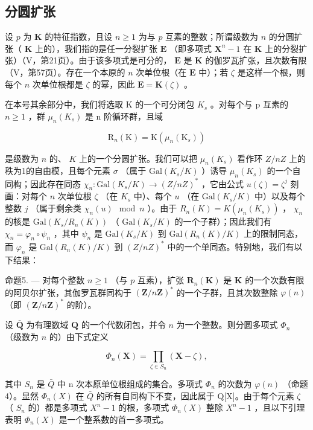 \subsection{分圆扩张}

设 \(p\) 为 \(\mathbf{K}\) 的特征指数，且设 \(n \geqslant 1\) 为与 \(p\) 互素的整数；所谓级数为 \(n\) 的分圆扩张（ \(\mathbf{K}\) 上的），我们指的是任一分裂扩张 \(\mathbf{E}\) （即多项式 \(\mathbf{X}^n - 1\) 在 \(\mathbf{K}\) 上的分裂扩张）（V，第21页）。由于该多项式是可分的， \(\mathbf{E}\) 是 \(\mathbf{K}\) 的伽罗瓦扩张，且次数有限（V，第57页）。存在一个本原的 \(n\) 次单位根（在 \(\mathbf{E}\) 中）；若 \(\zeta\) 是这样一个根，则每个 \(n\) 次单位根都是 \(\zeta\) 的幂，因此 \(\mathbf{E} = \mathbf{K}(\zeta)\) 。

在本号其余部分中，我们将选取 K 的一个可分闭包 \(K_{s}\) 。对每个与 p 互素的 \(n \geqslant 1\) ，群 \(\mu_{n}(K_{s})\) 是 n 阶循环群，且域

\[
\mathrm{R} _ {n} (\mathrm{K}) = \mathrm{K} \left(\mu_ {n} \left(\mathrm{K} _ {s}\right)\right)
\]

是级数为 \(n\) 的、 \(K\) 上的一个分圆扩张。我们可以把 \(\mu_n(K_s)\) 看作环 \(Z/nZ\) 上的秩为1的自由模，且每个元素 \(\sigma\) （属于 \(\text{Gal}(K_s/K)\) ）诱导 \(\mu_n(K_s)\) 的一个自同构；因此存在同态 \(\chi_n: \text{Gal}(K_s/K) \to (Z/nZ)^*\) ，它由公式 \(u(\zeta) = \zeta^j\) 刻画：对每个 \(n\) 次单位根 \(\zeta\) （在 \(K_s\) 中）、每个 \(u\) （在 \(\text{Gal}(K_s/K)\) 中）以及每个整数 \(j\) （属于剩余类 \(\chi_n(u) \mod n\) ）。由于 \(R_n(K) = K(\mu_n(K_s))\) ， \(\chi_n\) 的核是 \(\text{Gal}(K_s/R_n(K))\) （ \(\text{Gal}(K_s/K)\) 的一个子群）；因此我们有 \(\chi_n = \varphi_n \circ \psi_n\) ，其中 \(\psi_n\) 是 \(\text{Gal}(K_s/K)\) 到 \(\text{Gal}(R_n(K)/K)\) 上的限制同态，而 \(\varphi_n\) 是 \(\text{Gal}(R_n(K)/K)\) 到 \((Z/nZ)^*\) 中的一个单同态。特别地，我们有以下结果：

命题5. --- 对每个整数 \(n \geqslant 1\) （与 \(p\) 互素），扩张 \(\mathbf{R}_n(\mathbf{K})\) 是 \(\mathbf{K}\) 的一个次数有限的阿贝尔扩张，其伽罗瓦群同构于 \((\mathbf{Z}/n\mathbf{Z})^*\) 的一个子群，且其次数整除 \(\varphi(n)\) （即 \((\mathbf{Z}/n\mathbf{Z})^*\) 的阶）。

设 \(\bar{\mathbf{Q}}\) 为有理数域 \(\mathbf{Q}\) 的一个代数闭包，并令 \(n\) 为一个整数。则分圆多项式 \(\Phi_n\) （级数为 \(n\) 的）由下式定义

\[
\Phi_ {n} (\mathbf {X}) = \prod_ {\zeta \in S _ {n}} \left(\mathbf {X} - \zeta\right),\tag{5}
\]

其中 \(S_{n}\) 是 \(\bar{Q}\) 中 n 次本原单位根组成的集合。多项式 \(\Phi_{n}\) 的次数为 \(\varphi(n)\) （命题4）。显然 \(\Phi_{n}(X)\) 在 \(\bar{Q}\) 的所有自同构下不变，因此属于 Q{[}X{]}。由于每个元素 \(\zeta\) （ \(S_{n}\) 的）都是多项式 \(X^{n}-1\) 的根，多项式 \(\Phi_{n}(X)\) 整除 \(X^{n}-1\) ，且以下引理表明 \(\Phi_{n}(X)\) 是一个整系数的首一多项式。

